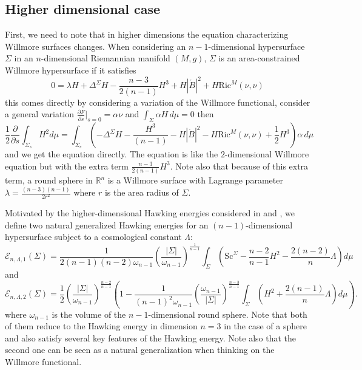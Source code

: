 \documentclass[12pt,a4paper]{amsart}
\theoremstyle{plain}
\theoremstyle{definition}
\begin{document}
\subsection{Higher dimensional case}\label{higherdimsec}

First, we need to note that in higher dimensions the equation characterizing  Willmore surfaces changes. When considering an $n-1$-dimensional hypersurface $\Sigma$ in an $n$-dimensional Riemannian manifold $(M,g)$, $\Sigma$ is an area-constrained Willmore hypersurface if it satisfies  
\begin{equation}\label{willmorehigherdim}
    0= \lambda H  +\Delta^\Sigma H- \frac{n-3}{2(n-1)}H^3 + H|\mathring{B}|^2+ H \mathrm{Ric}^M(\nu, \nu) 
\end{equation}
this comes directly by considering a variation of the Willmore functional, consider a general variation  \( \frac{\partial F}{\partial s} \Big|_{s=0} = \alpha \nu \) and $\int_{\Sigma} \alpha H \, d\mu = 0$ then 
\begin{equation}
   \frac{1}{2} \frac{\partial }{\partial s}  \int_{\Sigma_s}H^2d\mu = \int_{\Sigma_s}( - \Delta^\Sigma H- \frac{H^3}{(n-1)} - H|\mathring{B}|^2- H \mathrm{Ric}^M(\nu, \nu) +\frac{1}{2} H^3) \alpha \,
  d\mu 
\end{equation}
and we get the equation directly. The equation  is like the $2$-dimensional Willmore equation  but with the extra term $ \frac{n-3}{2(n-1)}H^3 $. Note also that because of this extra term, a round sphere in $\mathbb{R}^n$ is a Willmore surface with Lagrange parameter $\lambda= \frac{(n-3)(n-1)}{2r^2}$ where $r$ is the area radius of $\Sigma$.  

Motivated by the higher-dimensional Hawking energies considered in \cite{miao2017quasi} and \cite{pacheco2023constructing}, we define two natural generalized Hawking energies for an $(n-1)$-dimensional hypersurface subject to a cosmological constant $\Lambda$: 
\begin{equation}\label{energy_1_general}
\mathcal{E}_{n,\Lambda,1}(\Sigma) = \frac{1}{2(n-1)(n-2) \omega_{n-1}}\left( \frac{|\Sigma|}{\omega_{n-1}} \right)^{\frac{1}{n-1}}\int_{\Sigma}\left( \mathrm{Sc}^{\Sigma} - \frac{n-2}{n-1} H^2 - \frac{2(n-2)}{n}\Lambda \right)d\mu\end{equation}
and
\begin{equation}\label{energy_2_general}
\mathcal{E}_{n,\Lambda,2}(\Sigma) = \frac{1}{2} \left( \frac{|\Sigma|}{\omega_{n-1}} \right)^{\frac{n-2}{n-1}} \left(1  - \frac{1}{(n-1)^2 \omega_{n-1}} \left( \frac{\omega_{n-1}}{ |\Sigma|} \right)^{\frac{n-3}{n-1}} \int_{\Sigma } \left(H^2+\frac{2(n-1)}{n} \Lambda\right)d\mu \right).
\end{equation}
where $\omega_{n-1}$ is the volume of the $n-1$-dimensional round sphere. 
Note that both of them reduce to the Hawking energy in dimension $n=3$ in the case of a sphere and also satisfy several key features of the Hawking energy.  Note also that the second one can be seen as a natural generalization when thinking on the  Willmore functional.
\end{document}
